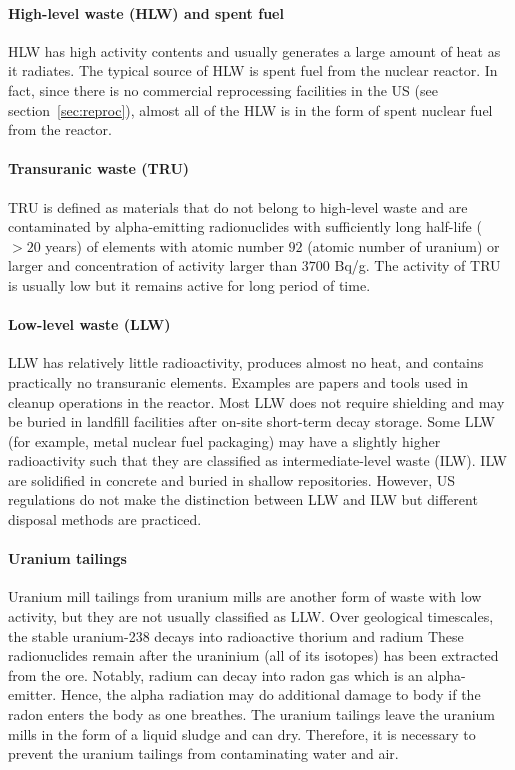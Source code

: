 \documentclass[nofootinbib,preprint,aps]{revtex4-1}
\begin{document}
    \paragraph{High-level waste (HLW) and spent fuel}
    HLW has high activity contents and usually generates a large amount of
    heat as it radiates. The typical source of HLW is spent fuel from the nuclear reactor.
    In fact, since there is no commercial reprocessing facilities in the US (see section~\ref{sec:reproc}),
    almost all of the HLW is in the form of spent nuclear fuel from the reactor.
    \paragraph{Transuranic waste (TRU)}
    TRU is defined as materials that do not belong to high-level waste and are
    contaminated by alpha-emitting radionuclides with
    sufficiently long half-life ($>20$ years) of elements with atomic number $92$ (atomic number of uranium)
    or larger and concentration of activity larger than $3700$ Bq/g.\cite{j83,s01} The activity
    of TRU is usually low but it remains active for long period of time.

    \paragraph{Low-level waste (LLW)}
    LLW has relatively little radioactivity, produces almost no heat,
    and contains practically no
    transuranic elements. Examples are papers and tools used in cleanup operations in the reactor.
    Most LLW does not require shielding and may be buried in landfill 
    facilities after on-site short-term decay storage.
    Some LLW (for example, metal nuclear fuel packaging) may have a slightly
    higher radioactivity such that they are classified
    as intermediate-level waste (ILW). ILW are solidified in concrete and buried in shallow
    repositories.\cite{s01} However, US regulations do not make the distinction
    between LLW and ILW but different disposal methods are practiced.\cite{nrc09, s01}

    \paragraph{Uranium tailings}
    Uranium mill tailings from uranium mills are another form of waste with low activity, but
    they are not usually classified as LLW.
    Over geological timescales, the stable uranium-238 decays into radioactive thorium and radium 
    These radionuclides remain after the uraninium (all of its isotopes)
    has been extracted from the ore. Notably, radium
    can decay into radon gas which is an alpha-emitter. Hence, the alpha radiation may do additional
    damage to body if the radon enters the body as one breathes.
    The uranium tailings leave the uranium mills in the form of a liquid sludge
    and can dry. Therefore, it is necessary to prevent the uranium tailings
    from contaminating water and air.
    
\end{document}
